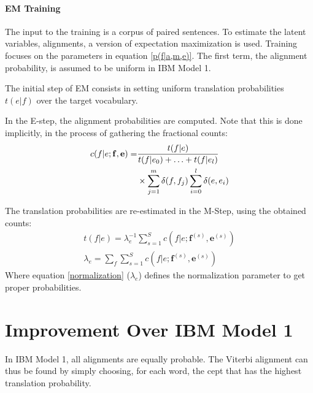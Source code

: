\documentclass[11pt]{article}
\renewcommand{\vec}[1]{\mathbf{#1}}
\begin{document}


\paragraph{EM Training}
The input to the training is a corpus of paired sentences.
To estimate the latent variables, alignments, a version of expectation maximization is used.
Training focuses on the parameters in equation \ref{p(f|a,m,e)}. The first term, the alignment probability, is assumed to be uniform in IBM Model 1.

The initial step of EM consists in setting uniform translation probabilities $t(e|f)$ over the target vocabulary. 

In the E-step, the alignment probabilities are computed. Note that this is done implicitly, in the process of gathering the fractional counts:
\begin{align}
c(f|e;\vec{f},\vec{e}) =& 
\frac{t(f|e)}{t(f|e_0)+\ldots+t(f|e_l)} \notag\\
&\times \sum_{j=1}^m \delta(f,f_j) \sum_{i=0}^l \delta(e,e_i)
\end{align}

The translation probabilities are re-estimated in the M-Step, using the obtained counts:
\begin{align}
t(f|e) = \lambda_e^{-1} \sum_{s=1}^S c(f|e;\vec{f}^{(s)},\vec{e}^{(s)})\\ 
\lambda_e = \sum_f\sum_{s=1}^S c(f|e;\vec{f}^{(s)},\vec{e}^{(s)}) \label{normalization}
\end{align}
Where equation \ref{normalization} ($\lambda_e$) defines the normalization parameter to get proper probabilities.


\section{Improvement Over IBM Model 1}
\label{Improvement}

In IBM Model 1, all alignments are equally probable. The Viterbi alignment can thus be found by simply choosing, for each word, the cept that has the highest translation probability. 
\end{document}
